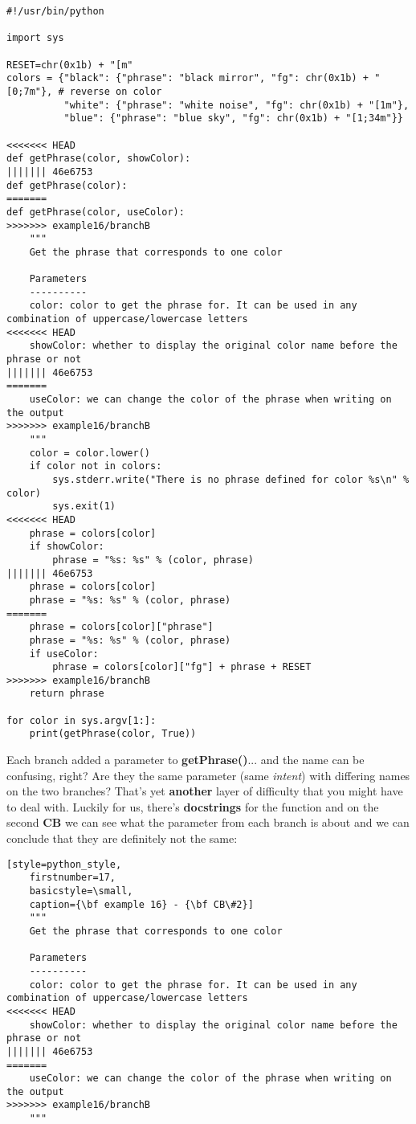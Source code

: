 \begin{lstlisting}[style=python_style,
	basicstyle=\small,
	caption={\bf example 16} - full conflicted file]
#!/usr/bin/python

import sys

RESET=chr(0x1b) + "[m"
colors = {"black": {"phrase": "black mirror", "fg": chr(0x1b) + "[0;7m"}, # reverse on color
          "white": {"phrase": "white noise", "fg": chr(0x1b) + "[1m"},
          "blue": {"phrase": "blue sky", "fg": chr(0x1b) + "[1;34m"}}

<<<<<<< HEAD
def getPhrase(color, showColor):
||||||| 46e6753
def getPhrase(color):
=======
def getPhrase(color, useColor):
>>>>>>> example16/branchB
    """
    Get the phrase that corresponds to one color
    
    Parameters
    ----------
    color: color to get the phrase for. It can be used in any combination of uppercase/lowercase letters
<<<<<<< HEAD
    showColor: whether to display the original color name before the phrase or not
||||||| 46e6753
=======
    useColor: we can change the color of the phrase when writing on the output
>>>>>>> example16/branchB
    """
    color = color.lower()
    if color not in colors:
        sys.stderr.write("There is no phrase defined for color %s\n" % color)
        sys.exit(1)
<<<<<<< HEAD
    phrase = colors[color]
    if showColor:
        phrase = "%s: %s" % (color, phrase)
||||||| 46e6753
    phrase = colors[color]
    phrase = "%s: %s" % (color, phrase)
=======
    phrase = colors[color]["phrase"]
    phrase = "%s: %s" % (color, phrase)
    if useColor:
        phrase = colors[color]["fg"] + phrase + RESET
>>>>>>> example16/branchB
    return phrase

for color in sys.argv[1:]:
    print(getPhrase(color, True))
\end{lstlisting}

Each branch added a parameter to {\bf getPhrase()}... and the name can be confusing, right? Are they the same parameter (same {\it intent})
with differing names on the two branches? That's yet {\bf another} layer of difficulty that you might have to deal with. Luckily for us,
there's {\bf docstrings} for the function and on the second {\bf CB} we can see what the parameter from each branch is about and we can
conclude that they are definitely not the same:

\begin{lstlisting}[style=python_style,
	firstnumber=17,
	basicstyle=\small,
	caption={\bf example 16} - {\bf CB\#2}]
    """
    Get the phrase that corresponds to one color
    
    Parameters
    ----------
    color: color to get the phrase for. It can be used in any combination of uppercase/lowercase letters
<<<<<<< HEAD
    showColor: whether to display the original color name before the phrase or not
||||||| 46e6753
=======
    useColor: we can change the color of the phrase when writing on the output
>>>>>>> example16/branchB
    """
\end{lstlisting}


